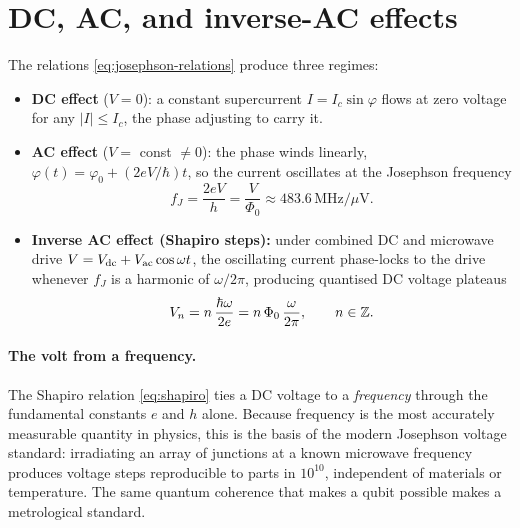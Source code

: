 \section{DC, AC, and inverse-AC effects}
\label{sec:josephson-effects}

\begin{statement}
\label{stmt:josephson-effects}
The relations \cref{eq:josephson-relations} produce three regimes:
\begin{itemize}
\item \textbf{DC effect} ($V=0$): a constant supercurrent
  $I=I_c\sin\varphi$ flows at zero voltage for any $|I|\le I_c$, the
  phase adjusting to carry it.
\item \textbf{AC effect} ($V=$ const $\neq0$): the phase winds linearly,
  $\varphi(t)=\varphi_0+(2eV/\hbar)t$, so the current oscillates at the
  Josephson frequency
  \begin{equation}
  \label{eq:josephson-frequency}
  f_J=\frac{2eV}{h}=\frac{V}{\Phi_0}\approx 483.6\,\text{MHz}/\mu\text{V}.
  \end{equation}
\item \textbf{Inverse AC effect (Shapiro steps):} under combined DC and
  microwave drive $V=V_{\rm dc}+V_{\rm ac}\cos\omega t$, the oscillating
  current phase-locks to the drive whenever $f_J$ is a harmonic of
  $\omega/2\pi$, producing quantised DC voltage plateaus
  \begin{equation}
  \label{eq:shapiro}
  V_n = n\,\frac{\hbar\omega}{2e}=n\,\Phi_0\,\frac{\omega}{2\pi},
  \qquad n\in\mathbb{Z}.
  \end{equation}
\end{itemize}
\end{statement}

\paragraph{The volt from a frequency.}
The Shapiro relation \cref{eq:shapiro} ties a DC voltage to a
\emph{frequency} through the fundamental constants $e$ and $h$ alone.
Because frequency is the most accurately measurable quantity in
physics, this is the basis of the modern Josephson voltage standard:
irradiating an array of junctions at a known microwave frequency
produces voltage steps reproducible to parts in $10^{10}$,
independent of materials or temperature. The same quantum coherence
that makes a qubit possible makes a metrological standard.

